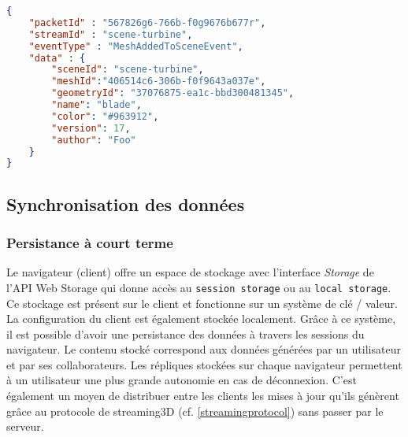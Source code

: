 
\begin{lstlisting}[language=json,firstnumber=1,label=jsonstore,caption=Format
 du Message transitant sur le réseau contenant l'événement MeshAddedToScene 
et ses 
paramètres]
{
	"packetId" : "567826g6-766b-f0g9676b677r",
	"streamId" : "scene-turbine",
	"eventType" : "MeshAddedToSceneEvent",
	"data" : {
		"sceneId": "scene-turbine",
		"meshId":"406514c6-306b-f0f9643a037e",
		"geometryId": "37076875-ea1c-bbd300481345",
		"name": "blade",
		"color": "#963912",
		"version": 17,
		"author": "Foo"
	}
}
\end{lstlisting}

\subsection{Synchronisation des données}
\subsubsection{Persistance à court terme}
Le navigateur (client) offre un espace de stockage avec l'interface \textit{Storage} 
de l'API Web Storage qui donne accès au \texttt{session storage} ou au  
\texttt{local storage}. Ce stockage est présent sur le client et fonctionne sur un système de clé / valeur. La configuration du client est également 
stockée localement. Grâce à ce système, il est possible d'avoir une 
persistance des données à travers les sessions du navigateur. Le contenu stocké 
correspond aux données générées par un utilisateur et par ses collaborateurs. Les 
répliques stockées sur chaque navigateur permettent à un utilisateur une plus 
grande 
autonomie en cas de déconnexion. C'est également un moyen de distribuer entre les clients les 
mises à jour qu'ils génèrent grâce au protocole de 
\gls{streaming3D} (cf. \ref{streamingprotocol}) sans passer par le serveur.

